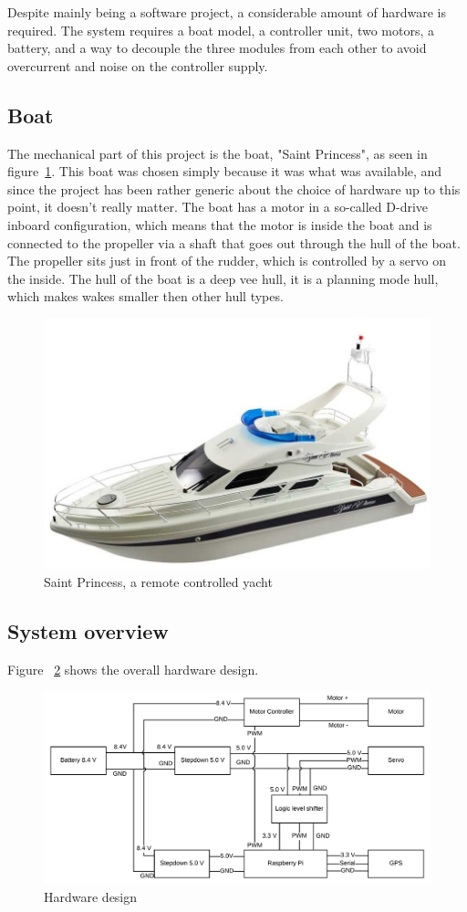 Despite mainly being a software project, a considerable amount of hardware is required. The system requires a boat model, a controller unit, two motors, a battery, and a way to decouple the three modules from each other to avoid overcurrent and noise on the controller supply. 


\subsection{Boat}
The mechanical part of this project is the boat, "Saint Princess", as seen in figure~\ref{fig:saintprincess}. This boat was chosen simply because it was what was available, and since the project has been rather generic about the choice of hardware up to this point, it doesn't really matter. The boat has a motor in a so-called D-drive inboard configuration\cite{motor_config}, which means that the motor is inside the boat and is connected to the propeller via a shaft that goes out through the hull of the boat. The propeller sits just in front of the rudder, which is controlled by a servo on the inside. The hull of the boat is a deep vee hull\cite{hull-types}, it is a planning mode hull, which makes wakes smaller then other hull types.

\begin{figure}[H]
\centering
\includegraphics[width=0.5\linewidth]{saint_princess}
\caption{Saint Princess, a remote controlled yacht\cite{saint_princess}}
\label{fig:saintprincess}
\end{figure}

\subsection{System overview}

Figure ~\ref{fig:hardware_design} shows the overall hardware design. 

\begin{figure}[H]
\centering
\includegraphics[width=1\linewidth]{Hardware_design}
\caption{Hardware design}
\label{fig:hardware_design}
\end{figure}

